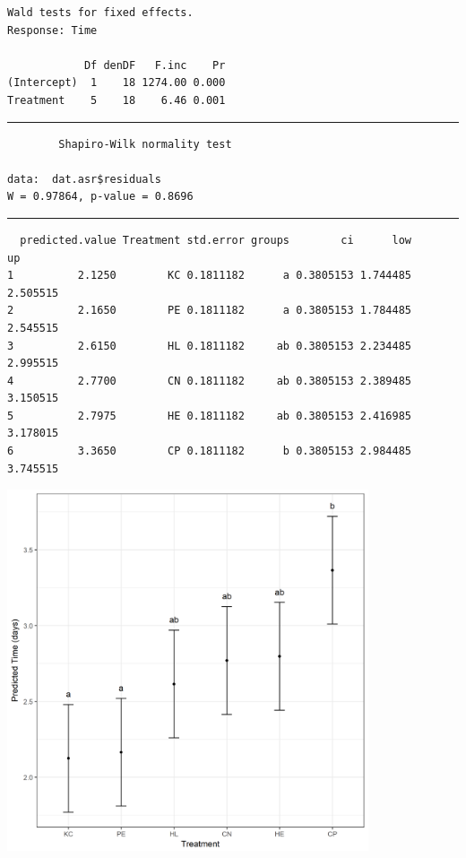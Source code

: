 \documentclass[a4paper, 10pt, fleqn, twosided]{memoir}
\begin{document}
\begin{tcolorbox}[title = Exercise 8 output continued]
\begin{verbatim}
Wald tests for fixed effects.
Response: Time

            Df denDF   F.inc    Pr
(Intercept)  1    18 1274.00 0.000
Treatment    5    18    6.46 0.001
\end{verbatim}
{\color{outpt} {\hrule height 1pt}}
\begin{verbatim}
        Shapiro-Wilk normality test

data:  dat.asr$residuals
W = 0.97864, p-value = 0.8696
\end{verbatim}
{\color{outpt} {\hrule height 1pt}}
\begin{verbatim}
  predicted.value Treatment std.error groups        ci      low       up
1          2.1250        KC 0.1811182      a 0.3805153 1.744485 2.505515
2          2.1650        PE 0.1811182      a 0.3805153 1.784485 2.545515
3          2.6150        HL 0.1811182     ab 0.3805153 2.234485 2.995515
4          2.7700        CN 0.1811182     ab 0.3805153 2.389485 3.150515
5          2.7975        HE 0.1811182     ab 0.3805153 2.416985 3.178015
6          3.3650        CP 0.1811182      b 0.3805153 2.984485 3.745515
\end{verbatim}
\end{tcolorbox}

\begin{tcolorbox}[title = Exercise 8 output continued]
\includegraphics[width=0.8\textwidth, frame]{Exercise8Pred.png}
\end{tcolorbox}
\end{document}
